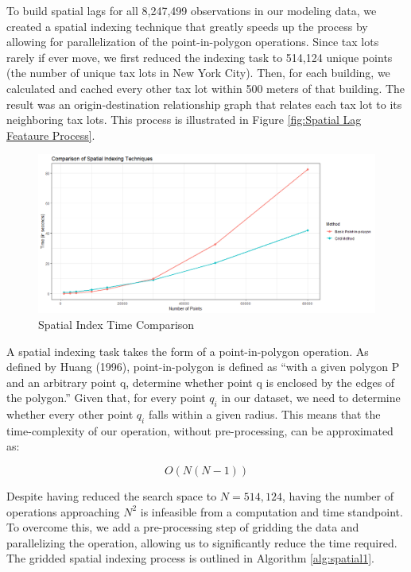\documentclass[12pt,]{article}
\begin{document}
To build spatial lags for all 8,247,499 observations in our modeling
data, we created a spatial indexing technique that greatly speeds up the
process by allowing for parallelization of the point-in-polygon
operations. Since tax lots rarely if ever move, we first reduced the
indexing task to 514,124 unique points (the number of unique tax lots in
New York City). Then, for each building, we calculated and cached every
other tax lot within 500 meters of that building. The result was an
origin-destination relationship graph that relates each tax lot to its
neighboring tax lots. This process is illustrated in Figure
\ref{fig:Spatial Lag Feataure Process}.

\begin{figure}[h]
\includegraphics[width=1\linewidth]{Sections/tables and figures/Example Spatial Indexing Techniques} \caption{Spatial Index Time Comparison}\label{fig:Spatial Indexing Process}
\end{figure}

A spatial indexing task takes the form of a point-in-polygon operation.
As defined by Huang (1996), point-in-polygon is defined as ``with a
given polygon P and an arbitrary point q, determine whether point q is
enclosed by the edges of the polygon.'' Given that, for every point
\(q_i\) in our dataset, we need to determine whether every other point
\(q_i\) falls within a given radius. This means that the time-complexity
of our operation, without pre-processing, can be approximated as:

\[
O(N(N-1))
\]

\noindent Despite having reduced the search space to \(N=514,124\),
having the number of operations approaching \(N^2\) is infeasible from a
computation and time standpoint. To overcome this, we add a
pre-processing step of gridding the data and parallelizing the
operation, allowing us to significantly reduce the time required. The
gridded spatial indexing process is outlined in Algorithm
\ref{alg:spatial1}.
\end{document}
